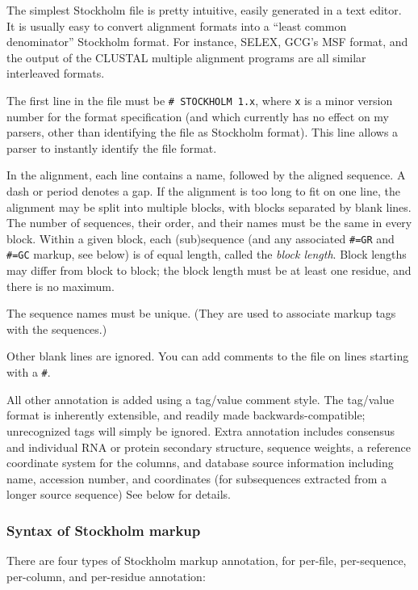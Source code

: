 The simplest Stockholm file is pretty intuitive, easily generated in a
text editor. It is usually easy to convert alignment formats into a
``least common denominator'' Stockholm format. For instance, SELEX,
GCG's MSF format, and the output of the CLUSTAL multiple alignment
programs are all similar interleaved formats.

The first line in the file must be \verb+# STOCKHOLM 1.x+, where
\verb+x+ is a minor version number for the format specification (and
which currently has no effect on my parsers, other than identifying
the file as Stockholm format). This line allows a parser to instantly
identify the file format.

In the alignment, each line contains a name, followed by the aligned
sequence. A dash or period denotes a gap. If the alignment is too long
to fit on one line, the alignment may be split into multiple blocks,
with blocks separated by blank lines. The number of sequences, their
order, and their names must be the same in every block. Within a given
block, each (sub)sequence (and any associated \verb+#=GR+ and
\verb+#=GC+ markup, see below) is of equal length, called the
\textit{block length}. Block lengths may differ from block to block;
the block length must be at least one residue, and there is no
maximum.  

The sequence names must be unique. (They are used to associate markup
tags with the sequences.)

Other blank lines are ignored. You can add comments to the file on
lines starting with a \verb+#+.

All other annotation is added using a tag/value comment style. The
tag/value format is inherently extensible, and readily made
backwards-compatible; unrecognized tags will simply be ignored. Extra
annotation includes consensus and individual RNA or protein secondary
structure, sequence weights, a reference coordinate system for the
columns, and database source information including name, accession
number, and coordinates (for subsequences extracted from a longer
source sequence) See below for details.

\subsubsection{Syntax of Stockholm markup}

There are four types of Stockholm markup annotation, for per-file,
per-sequence, per-column, and per-residue annotation:

